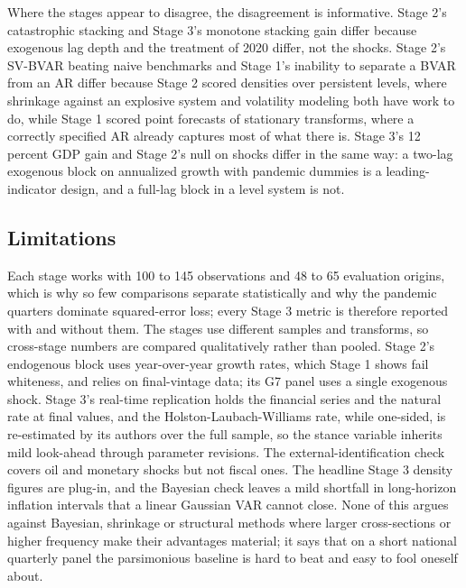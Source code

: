 \documentclass[conference]{IEEEtran}
\begin{document}
Where the stages appear to disagree, the disagreement is informative. Stage 2's catastrophic stacking and Stage 3's monotone stacking gain differ because exogenous lag depth and the treatment of 2020 differ, not the shocks. Stage 2's SV-BVAR beating naive benchmarks and Stage 1's inability to separate a BVAR from an AR differ because Stage 2 scored densities over persistent levels, where shrinkage against an explosive system and volatility modeling both have work to do, while Stage 1 scored point forecasts of stationary transforms, where a correctly specified AR already captures most of what there is. Stage 3's 12 percent GDP gain and Stage 2's null on shocks differ in the same way: a two-lag exogenous block on annualized growth with pandemic dummies is a leading-indicator design, and a full-lag block in a level system is not.

\subsection{Limitations}
Each stage works with 100 to 145 observations and 48 to 65 evaluation origins, which is why so few comparisons separate statistically and why the pandemic quarters dominate squared-error loss; every Stage 3 metric is therefore reported with and without them. The stages use different samples and transforms, so cross-stage numbers are compared qualitatively rather than pooled. Stage 2's endogenous block uses year-over-year growth rates, which Stage 1 shows fail whiteness, and relies on final-vintage data; its G7 panel uses a single exogenous shock. Stage 3's real-time replication holds the financial series and the natural rate at final values, and the Holston-Laubach-Williams rate, while one-sided, is re-estimated by its authors over the full sample, so the stance variable inherits mild look-ahead through parameter revisions. The external-identification check covers oil and monetary shocks but not fiscal ones. The headline Stage 3 density figures are plug-in, and the Bayesian check leaves a mild shortfall in long-horizon inflation intervals that a linear Gaussian VAR cannot close. None of this argues against Bayesian, shrinkage or structural methods where larger cross-sections or higher frequency make their advantages material; it says that on a short national quarterly panel the parsimonious baseline is hard to beat and easy to fool oneself about.
\end{document}
